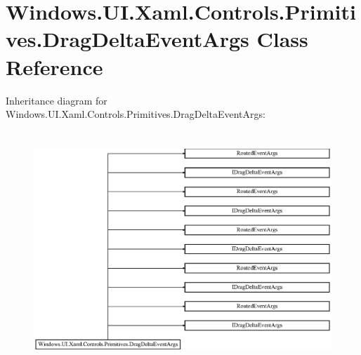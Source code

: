 \hypertarget{class_windows_1_1_u_i_1_1_xaml_1_1_controls_1_1_primitives_1_1_drag_delta_event_args}{}\section{Windows.\+U\+I.\+Xaml.\+Controls.\+Primitives.\+Drag\+Delta\+Event\+Args Class Reference}
\label{class_windows_1_1_u_i_1_1_xaml_1_1_controls_1_1_primitives_1_1_drag_delta_event_args}
Inheritance diagram for Windows.\+U\+I.\+Xaml.\+Controls.\+Primitives.\+Drag\+Delta\+Event\+Args\+:\begin{figure}[H]
\begin{center}
\leavevmode
\includegraphics[height=8.901734cm]{class_windows_1_1_u_i_1_1_xaml_1_1_controls_1_1_primitives_1_1_drag_delta_event_args}
\end{center}
\end{figure}
